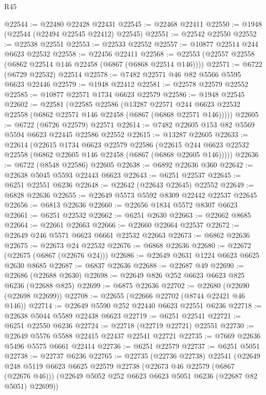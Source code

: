 \begin{lexlean}{R45}
\begin{coremodule}
{@22544 := @22480 @22428 @22431
@22545 := @22468 @22411
@22550 := @1948 (@22544 (@22494 @22545 @22412) @22545)
@22551 := @22542 @22550
@22552 := @22538 @22551
@22553 := @22533 @22552
@22557 := @10877 @22514 @244 @6623 @22532
@22558 := @22456 @22411
@22568 := @22553 (@22557 @22558 (@6862 @22514 @146 @22458 (@6867 (@6868 @22514 @146))))
@22571 := @6722 (@6729 @22532) @22514
@22578 := @7482 @22571 @46 @82 @5566 @5595 @6623 @22446
@22579 := @1948 @22412
@22581 := @22578 @22579 @22552
@22585 := @10877 @22571 @1734 @6623 @22579
@22586 := @1948 @22545
@22602 := @22581
    (@22585
      @22586
      (@13287
        @22571
        @244
        @6623
        @22532
        @22558
        (@6862 @22571 @146 @22458 (@6867 (@6868 @22571 @146)))))
@22605 := @6722 (@6726 @22579) @22571
@22614 := @7482 @22605 @153 @82 @5569 @5594 @6623 @22445 @22586 @22552
@22615 := @13287 @22605
@22633 := @22614
    (@22615
      @1734
      @6623
      @22579
      @22586
      (@22615 @244 @6623 @22532 @22558 (@6862 @22605 @146 @22458 (@6867 (@6868 @22605 @146)))))
@22636 := @6722 (@8548 @22586) @22605
@22638 := @6892 @22636 @360
@22642 := @22638 @5045 @5593 @22443 @6623
@22643 := @6251 @22537
@22645 := @6251 @22551 @6236
@22648 := @22642 (@22643 @22645) @22552
@22649 := @6828 @22636
@22655 := @22649 @5573 @5592 @8309 @22442 @22537 @22645
@22656 := @6813 @22636
@22660 := @22656 @1834 @5572 @8307 @6623
@22661 := @6251 @22532
@22662 := @6251 @2630
@22663 := @22662 @8685
@22664 := @22661 @22663
@22666 := @22660 @22664 @22537
@22672 := @22649 @246 @5571 @6623 @6661 @22532 @22663
@22673 := @6862 @22636
@22675 := @22673 @24 @22532
@22676 := @6868 @22636
@22680 := @22672 (@22675 (@6867 (@22676 @24)))
@22686 := @22649 @2631 @1224 @6623 @6625 @2630 @8685
@22687 := @6837 @22636
@22688 := @22687 @49
@22690 := @22686 (@22688 @2630)
@22698 := @22649 @826 @252 @6623 @6623 @825 @6236 (@22688 @825)
@22699 := @6875 @22636
@22702 := @22680 (@22690 (@22698 @22699))
@22708 := @22655 (@22666 @22702 (@8744 @22421 @46 @146))
@22714 := @22649 @5590 @252 @22440 @6623 @22551 @6236
@22718 := @22638 @5044 @5589 @22438 @6623
@22719 := @6251 @22541
@22721 := @6251 @22550 @6236
@22724 := @22718 (@22719 @22721) @22551
@22730 := @22649 @5576 @5588 @22415 @22437 @22541 @22721
@22735 := @7669 @22636 @5496 @5575 @6661 @22414
@22736 := @6251 @22579
@22737 := @6251 @5051
@22738 := @22737 @6236
@22765 := @22735
    (@22736 @22738)
    @22541
    (@22649
      @248
      @5119
      @6623
      @6625
      @22579
      @22738
      (@22673 @46 @22579 (@6867 (@22676 @46)))
      (@22649 @5052 @252 @6623 @6623 @5051 @6236 (@22687 @82 @5051) @22699))
}
\end{coremodule}
\end{lexlean}
